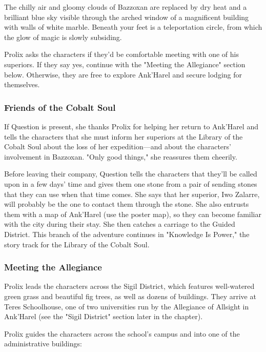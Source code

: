 \documentclass[10pt,a4paper,twoside,twocolumn,openany,nodeprecatedcode]{dndbook}
\begin{document}
\begin{DndReadAloud}{}
The chilly air and gloomy clouds of Bazzoxan are replaced by dry heat and a brilliant blue sky visible through the arched window of a magnificent building with walls of white marble. Beneath your feet is a teleportation circle, from which the glow of magic is slowly subsiding.

\end{DndReadAloud}

Prolix asks the characters if they'd be comfortable meeting with one of his superiors. If they say yes, continue with the "Meeting the Allegiance" section below. Otherwise, they are free to explore Ank'Harel and secure lodging for themselves.

\subsubsection{Friends of the Cobalt Soul}
If Question is present, she thanks Prolix for helping her return to Ank'Harel and tells the characters that she must inform her superiors at the Library of the Cobalt Soul about the loss of her expedition—and about the characters' involvement in Bazzoxan. "Only good things," she reassures them cheerily.

Before leaving their company, Question tells the characters that they'll be called upon in a few days' time and gives them one stone from a pair of sending stones that they can use when that time comes. She says that her superior, Iwo Zalarre, will probably be the one to contact them through the stone. She also entrusts them with a map of Ank'Harel (use the poster map), so they can become familiar with the city during their stay. She then catches a carriage to the Guided District. This branch of the adventure continues in "Knowledge Is Power," the story track for the Library of the Cobalt Soul.

\subsubsection{Meeting the Allegiance}
Prolix leads the characters across the Sigil District, which features well-watered green grass and beautiful fig trees, as well as dozens of buildings. They arrive at Teres Schoolhouse, one of two universities run by the Allegiance of Allsight in Ank'Harel (see the "Sigil District" section later in the chapter).

Prolix guides the characters across the school's campus and into one of the administrative buildings:
\end{document}
